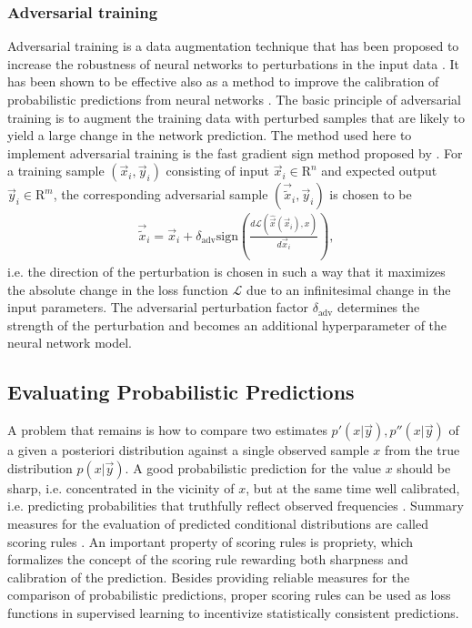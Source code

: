 \documentclass[journal abbreviation, manuscript]{copernicus}
\begin{document}
\subsubsection{Adversarial training}
\label{sec:adversarial_training}

  Adversarial training is a data augmentation technique that has been proposed
  to increase the robustness of neural networks to perturbations in the input
  data \citep{goodfellow_2}. It has been shown to be effective also as a method
  to improve the calibration of probabilistic predictions from neural networks
  \citep{lakshminarayanan}. The basic principle of adversarial training is to
  augment the training data with perturbed samples that are likely to
  yield a large change in the network prediction. The method used here to
  implement adversarial training  is the fast gradient sign method
  proposed by \citet{goodfellow_2}. For a training sample $(\vec{x}_i, \vec{y}_i)$
  consisting of input $\vec{x}_i \in \mathrm{R}^{n}$ and expected output
  $\vec{y}_i \in \mathrm{R}^m$, the corresponding adversarial sample
  $(\vec{\tilde{x}}_i, \vec{y}_i)$ is chosen to be
    \begin{align}\label{eq:adversarial_training}
      \vec{\tilde{x}}_i = \vec{x}_i + \delta_\text{adv} \text{sign} \left (
     \frac{d \mathcal{L}(\hat{\vec{x}}(\vec{x}_i), x)}{d\vec{x}_i}
      \right ),
    \end{align}
    i.e. the direction of the perturbation is chosen in such a way that
    it maximizes the absolute change in the loss function $\mathcal{L}$ due
    to an infinitesimal change in the input parameters. The adversarial
    perturbation factor $\delta_{\text{adv}}$ determines the strength of the perturbation
    and becomes an additional hyperparameter of the neural network model.

\subsection{Evaluating Probabilistic Predictions}

A problem that remains is how to compare two estimates $p'(x | \vec{y}), p''(x
| \vec{y})$ of a given a posteriori distribution against a single observed sample
$x$ from the true distribution $p(x | \vec{y})$. A good
probabilistic prediction for the value $x$ should be sharp, i.e. concentrated in
the vicinity of $x$, but at the same time well calibrated, i.e. predicting
probabilities that truthfully reflect observed frequencies \citep{gneiting_2}.
Summary measures for the evaluation of predicted conditional distributions are
called scoring rules \citep{gneiting}. An important property of scoring rules
is propriety, which formalizes the concept of the scoring rule rewarding both
sharpness and calibration of the prediction. Besides providing reliable
measures for the comparison of probabilistic predictions, proper scoring rules
can be used as loss functions in supervised learning to incentivize
statistically consistent predictions.
\end{document}
